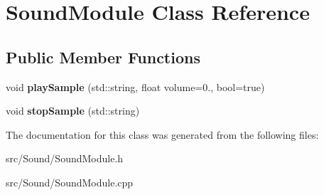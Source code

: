 \hypertarget{classSoundModule}{}\section{Sound\+Module Class Reference}
\label{classSoundModule}
\subsection*{Public Member Functions}
\begin{DoxyCompactItemize}
\item 
void {\bfseries play\+Sample} (std\+::string, float volume=0., bool=true)\hypertarget{classSoundModule_a728e3a52c628f1d18cf6573e147fab0b}{}\label{classSoundModule_a728e3a52c628f1d18cf6573e147fab0b}

\item 
void {\bfseries stop\+Sample} (std\+::string)\hypertarget{classSoundModule_a31cf4382462c92e255e90fbb8836c935}{}\label{classSoundModule_a31cf4382462c92e255e90fbb8836c935}

\end{DoxyCompactItemize}


The documentation for this class was generated from the following files\+:\begin{DoxyCompactItemize}
\item 
src/\+Sound/Sound\+Module.\+h\item 
src/\+Sound/Sound\+Module.\+cpp\end{DoxyCompactItemize}
